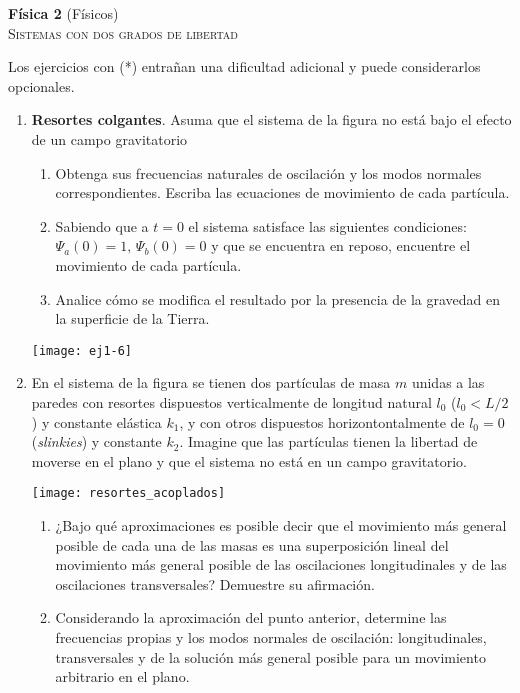 \documentclass[11pt,spanish,a4paper]{article}
\begin{document}
\begin{center}
\textbf{Física 2} (Físicos) \hfill {}\\
	\textsc{\LARGE Sistemas con dos grados de libertad}
\end{center}


Los ejercicios con (*) entrañan una dificultad adicional y puede considerarlos opcionales.

\begin{enumerate}


\item
\begin{minipage}[t][5cm]{0.75\textwidth}
\textbf{Resortes colgantes}.
Asuma que el sistema de la figura no está bajo el efecto de un campo gravitatorio
\begin{enumerate}
	\item Obtenga sus frecuencias naturales de oscilación y los modos normales correspondientes.
	Escriba las ecuaciones de movimiento de cada partícula.
	\item Sabiendo que a $t= 0$ el sistema satisface las siguientes condiciones: $\Psi_a(0)= 1, \, \Psi_b(0)= 0$ y que se encuentra en reposo, encuentre el movimiento de cada partícula.
	\item Analice cómo se modifica el resultado por la presencia de la gravedad en la superficie de la Tierra.
\end{enumerate}
\end{minipage}
\begin{minipage}[c][0cm][t]{0.2\textwidth}
  \texttt{[image: ej1-6]}
\end{minipage}



\item
\begin{minipage}[t][3cm]{0.6\textwidth}
En el sistema de la figura se tienen dos partículas de masa $m$ unidas a las paredes con resortes dispuestos verticalmente de longitud natural $l_0$ ($l_0< L/2$) y constante elástica $k_1$, y con otros dispuestos horizontontalmente de $l_0= 0$ (\emph{slinkies}) y constante $k_2$.
Imagine que las partículas tienen la libertad de moverse en el plano y que el sistema no está en un campo gravitatorio.
\end{minipage}
\begin{minipage}[c][1cm][t]{0.35\textwidth}
  \texttt{[image: resortes\_acoplados]}
\end{minipage}
\begin{enumerate}
	\item ¿Bajo qué aproximaciones es posible decir que el movimiento más general posible de cada una de las masas es una superposición lineal del movimiento más general posible de las oscilaciones longitudinales y de las oscilaciones transversales?
	Demuestre su afirmación.
	\item Considerando la aproximación del punto anterior, determine las frecuencias propias y los modos normales de oscilación: longitudinales, transversales y de la solución más general posible para un movimiento arbitrario en el plano.
\end{enumerate}




\end{enumerate}
\end{document}
